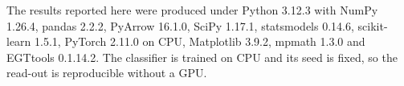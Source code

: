 \documentclass[openacc]{rsproca_new}
\begin{document}
The results reported here were produced under Python 3.12.3 with NumPy 1.26.4,
pandas 2.2.2, PyArrow 16.1.0, SciPy 1.17.1, statsmodels 0.14.6,
scikit-learn 1.5.1, PyTorch 2.11.0 on CPU, Matplotlib 3.9.2, mpmath 1.3.0 and
EGTtools 0.1.14.2. The classifier is trained on CPU and its seed is fixed, so
the read-out is reproducible without a GPU.


\printbibliography
\end{document}
